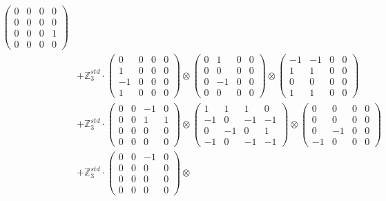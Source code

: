 \documentclass{article}
\begin{document}
{\begin{align}
            \begin{pmatrix} 0 & 0 & 0 & 0 \\ 0 & 0 & 0 & 0 \\ 0 & 0 & 0 & 1 \\ 0 & 0 & 0 & 0 \end{pmatrix} \\ 
        &+ \label{Rs16-Rc11-Solution-11-c25} \mathbb{Z}_3^{std} \cdot 
            \begin{pmatrix} 0 & 0 & 0 & 0 \\ 1 & 0 & 0 & 0 \\ -1 & 0 & 0 & 0 \\ 1 & 0 & 0 & 0 \end{pmatrix} \otimes 
            \begin{pmatrix} 0 & 1 & 0 & 0 \\ 0 & 0 & 0 & 0 \\ 0 & -1 & 0 & 0 \\ 0 & 0 & 0 & 0 \end{pmatrix} \otimes 
            \begin{pmatrix} -1 & -1 & 0 & 0 \\ 1 & 1 & 0 & 0 \\ 0 & 0 & 0 & 0 \\ 1 & 1 & 0 & 0 \end{pmatrix} \\ 
        &+ \label{Rs16-Rc11-Solution-11-c26} \mathbb{Z}_3^{std} \cdot 
            \begin{pmatrix} 0 & 0 & -1 & 0 \\ 0 & 0 & 1 & 1 \\ 0 & 0 & 0 & 0 \\ 0 & 0 & 0 & 0 \end{pmatrix} \otimes 
            \begin{pmatrix} 1 & 1 & 1 & 0 \\ -1 & 0 & -1 & -1 \\ 0 & -1 & 0 & 1 \\ -1 & 0 & -1 & -1 \end{pmatrix} \otimes 
            \begin{pmatrix} 0 & 0 & 0 & 0 \\ 0 & 0 & 0 & 0 \\ 0 & -1 & 0 & 0 \\ -1 & 0 & 0 & 0 \end{pmatrix} \\ 
        &+ \label{Rs16-Rc11-Solution-11-c27} \mathbb{Z}_3^{std} \cdot 
            \begin{pmatrix} 0 & 0 & -1 & 0 \\ 0 & 0 & 0 & 0 \\ 0 & 0 & 0 & 0 \\ 0 & 0 & 0 & 0 \end{pmatrix} \otimes 

\end{align}}
\end{document}
